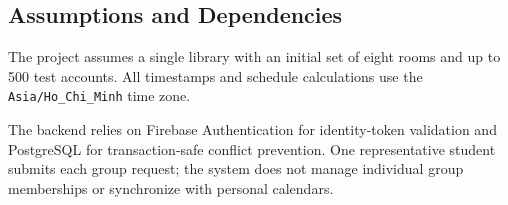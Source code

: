 \subsection{Assumptions and Dependencies}
The project assumes a single library with an initial set of eight rooms and up to 500 test accounts. All timestamps and schedule calculations use the \texttt{Asia/Ho\_Chi\_Minh} time zone.

The backend relies on Firebase Authentication for identity-token validation and PostgreSQL for transaction-safe conflict prevention. One representative student submits each group request; the system does not manage individual group memberships or synchronize with personal calendars.

\clearpage